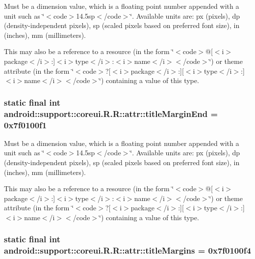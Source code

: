 Must be a dimension value, which is a floating point number appended with a unit such as \char`\"{}$<$code$>$14.5sp$<$/code$>$\char`\"{}. Available units are: px (pixels), dp (density-independent pixels), sp (scaled pixels based on preferred font size), in (inches), mm (millimeters). 

This may also be a reference to a resource (in the form \char`\"{}$<$code$>$@\mbox{[}$<$i$>$package$<$/i$>$:\mbox{]}$<$i$>$type$<$/i$>$:$<$i$>$name$<$/i$>$$<$/code$>$\char`\"{}) or theme attribute (in the form \char`\"{}$<$code$>$?\mbox{[}$<$i$>$package$<$/i$>$:\mbox{]}\mbox{[}$<$i$>$type$<$/i$>$:\mbox{]}$<$i$>$name$<$/i$>$$<$/code$>$\char`\"{}) containing a value of this type. \hypertarget{classandroid_1_1support_1_1coreui_1_1_r_1_1attr_5e8b2431492f4c1032a94be2dd27ac50}{
\subsubsection[{titleMarginEnd}]{\setlength{\rightskip}{0pt plus 5cm}static final int android::support::coreui.R.R::attr::titleMarginEnd = 0x7f0100f1}}
\label{classandroid_1_1support_1_1coreui_1_1_r_1_1attr_5e8b2431492f4c1032a94be2dd27ac50}


Must be a dimension value, which is a floating point number appended with a unit such as \char`\"{}$<$code$>$14.5sp$<$/code$>$\char`\"{}. Available units are: px (pixels), dp (density-independent pixels), sp (scaled pixels based on preferred font size), in (inches), mm (millimeters). 

This may also be a reference to a resource (in the form \char`\"{}$<$code$>$@\mbox{[}$<$i$>$package$<$/i$>$:\mbox{]}$<$i$>$type$<$/i$>$:$<$i$>$name$<$/i$>$$<$/code$>$\char`\"{}) or theme attribute (in the form \char`\"{}$<$code$>$?\mbox{[}$<$i$>$package$<$/i$>$:\mbox{]}\mbox{[}$<$i$>$type$<$/i$>$:\mbox{]}$<$i$>$name$<$/i$>$$<$/code$>$\char`\"{}) containing a value of this type. \hypertarget{classandroid_1_1support_1_1coreui_1_1_r_1_1attr_2a4e0649aef31c7ca9c4d19f79492c57}{
\subsubsection[{titleMargins}]{\setlength{\rightskip}{0pt plus 5cm}static final int android::support::coreui.R.R::attr::titleMargins = 0x7f0100f4}}
\label{classandroid_1_1support_1_1coreui_1_1_r_1_1attr_2a4e0649aef31c7ca9c4d19f79492c57}


